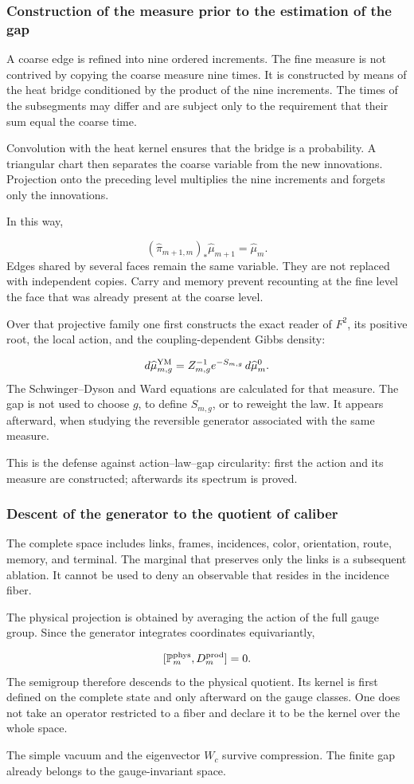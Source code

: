 \subsubsection{Construction of the measure prior to the estimation of the gap}
A coarse edge is refined into nine ordered increments. The fine measure is not contrived by copying the coarse measure nine times. It is constructed by means of the heat bridge conditioned by the product of the nine increments. The times of the subsegments may differ and are subject only to the requirement that their sum equal the coarse time.\par
Convolution with the heat kernel ensures that the bridge is a probability. A triangular chart then separates the coarse variable from the new innovations. Projection onto the preceding level multiplies the nine increments and forgets only the innovations.\par
In this way,\par
\[
(\widehat\pi_{m+1,m})_*
\widehat\mu_{m+1}
=
\widehat\mu_m.
\]
Edges shared by several faces remain the same variable. They are not replaced with independent copies. Carry and memory prevent recounting at the fine level the face that was already present at the coarse level.\par
Over that projective family one first constructs the exact reader of \(F^2\), its positive root, the local action, and the coupling-dependent Gibbs density:\par
\[
d\widehat\mu_{m,g}^{\rm YM}
=
Z_{m,g}^{-1}
e^{-S_{m,g}}\,
d\widehat\mu_m^0.
\]
The Schwinger–Dyson and Ward equations are calculated for that measure. The gap is not used to choose \(g\), to define \(S_{m,g}\), or to reweight the law. It appears afterward, when studying the reversible generator associated with the same measure.\par
This is the defense against action--law--gap circularity: first the action and its measure are constructed; afterwards its spectrum is proved.\par
{}
\subsubsection{Descent of the generator to the quotient of caliber}
The complete space includes links, frames, incidences, color, orientation, route, memory, and terminal. The marginal that preserves only the links is a subsequent ablation. It cannot be used to deny an observable that resides in the incidence fiber.\par
The physical projection is obtained by averaging the action of the full gauge group. Since the generator integrates coordinates equivariantly,\par
\[
[\mathbb P_m^{\rm phys},D_m^{\rm prod}]=0.
\]
The semigroup therefore descends to the physical quotient. Its kernel is first defined on the complete state and only afterward on the gauge classes. One does not take an operator restricted to a fiber and declare it to be the kernel over the whole space.\par
The simple vacuum and the eigenvector \(W_c\) survive compression. The finite gap already belongs to the gauge-invariant space.\par
{}
